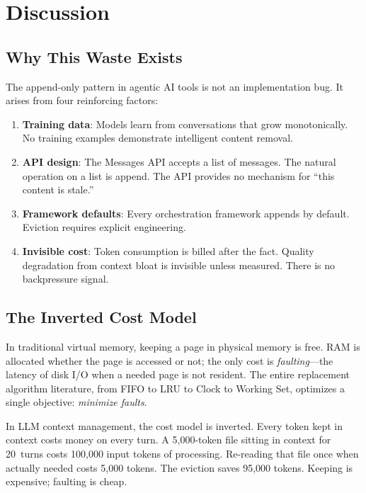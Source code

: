 \section{Discussion}
\label{sec:discussion}

\subsection{Why This Waste Exists}

The append-only pattern in agentic AI tools is not an implementation
bug. It arises from four reinforcing factors:

\begin{enumerate}[nosep]
  \item \textbf{Training data}: Models learn from conversations that
    grow monotonically. No training examples demonstrate intelligent
    content removal.
  \item \textbf{API design}: The Messages API accepts a list of
    messages. The natural operation on a list is append. The API
    provides no mechanism for ``this content is stale.''
  \item \textbf{Framework defaults}: Every orchestration framework
    appends by default. Eviction requires explicit engineering.
  \item \textbf{Invisible cost}: Token consumption is billed after
    the fact. Quality degradation from context bloat is invisible
    unless measured. There is no backpressure signal.
\end{enumerate}

\subsection{The Inverted Cost Model}
\label{sec:inverted-cost}

In traditional virtual memory, keeping a page in physical memory is
free. RAM is allocated whether the page is accessed or not; the only
cost is \emph{faulting}---the latency of disk I/O when a needed page
is not resident. The entire replacement algorithm literature, from
FIFO to LRU to Clock to Working Set, optimizes a single objective:
\emph{minimize faults}.

In LLM context management, the cost model is inverted. Every token
kept in context costs money on every turn. A 5{,}000-token file
sitting in context for 20~turns costs 100{,}000 input tokens of
processing. Re-reading that file once when actually needed costs
5{,}000 tokens. The eviction saves 95{,}000 tokens. Keeping is
expensive; faulting is cheap.

